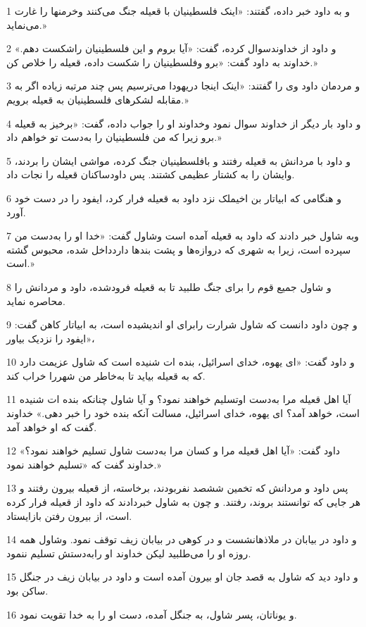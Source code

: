 \par 1 و به داود خبر داده، گفتند: «اینک فلسطینیان با قعیله جنگ می‌کنند وخرمنها را غارت می‌نماید.»
\par 2 و داود از خداوندسوال کرده، گفت: «آیا بروم و این فلسطینیان راشکست دهم.» خداوند به داود گفت: «برو وفلسطینیان را شکست داده، قعیله را خلاص کن.»
\par 3 و مردمان داود وی را گفتند: «اینک اینجا دریهودا می‌ترسیم پس چند مرتبه زیاده اگر به مقابله لشکرهای فلسطینیان به قعیله برویم.»
\par 4 و داود بار دیگر از خداوند سوال نمود وخداوند او را جواب داده، گفت: «برخیز به قعیله برو زیرا که من فلسطینیان را به‌دست تو خواهم داد.»
\par 5 و داود با مردانش به قعیله رفتند و بافلسطینیان جنگ کرده، مواشی ایشان را بردند، وایشان را به کشتار عظیمی کشتند. پس داودساکنان قعیله را نجات داد.
\par 6 و هنگامی که ابیاتار بن اخیملک نزد داود به قعیله فرار کرد، ایفود را در دست خود آورد.
\par 7 وبه شاول خبر دادند که داود به قعیله آمده است وشاول گفت: «خدا او را به‌دست من سپرده است، زیرا به شهری که دروازه‌ها و پشت بندها داردداخل شده، محبوس گشته است.»
\par 8 و شاول جمیع قوم را برای جنگ طلبید تا به قعیله فرودشده، داود و مردانش را محاصره نماید.
\par 9 و چون داود دانست که شاول شرارت رابرای او اندیشیده است، به ابیاتار کاهن گفت: «ایفود را نزدیک بیاور،
\par 10 و داود گفت: «ای یهوه، خدای اسرائیل، بنده ات شنیده است که شاول عزیمت دارد که به قعیله بیاید تا به‌خاطر من شهررا خراب کند.
\par 11 آیا اهل قعیله مرا به‌دست اوتسلیم خواهند نمود؟ و آیا شاول چنانکه بنده ات شنیده است، خواهد آمد؟ ای یهوه، خدای اسرائیل، مسالت آنکه بنده خود را خبر دهی.» خداوند گفت که او خواهد آمد.
\par 12 داود گفت: «آیا اهل قعیله مرا و کسان مرا به‌دست شاول تسلیم خواهند نمود؟» خداوند گفت که «تسلیم خواهند نمود.»
\par 13 پس داود و مردانش که تخمین ششصد نفربودند، برخاسته، از قعیله بیرون رفتند و هر جایی که توانستند بروند، رفتند. و چون به شاول خبردادند که داود از قعیله فرار کرده است، از بیرون رفتن بازایستاد.
\par 14 و داود در بیابان در ملاذهانشست و در کوهی در بیابان زیف توقف نمود. وشاول همه روزه او را می‌طلبید لیکن خداوند او رابه‌دستش تسلیم ننمود.
\par 15 و داود دید که شاول به قصد جان او بیرون آمده است و داود در بیابان زیف در جنگل ساکن بود.
\par 16 و یوناتان، پسر شاول، به جنگل آمده، دست او را به خدا تقویت نمود.
